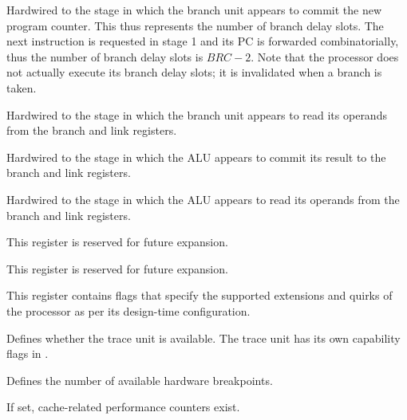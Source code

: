 \reset{****}
Hardwired to the stage in which the branch unit appears to commit the new
program counter. This thus represents the number of branch delay slots. The next
instruction is requested in stage 1 and its PC is forwarded combinatorially,
thus the number of branch delay slots is $BRC - 2$. Note that the \rvex{}
processor does not actually execute its branch delay slots; it is invalidated
when a branch is taken.

\reset{****}
Hardwired to the stage in which the branch unit appears to read its operands 
from the branch and link registers.

\reset{****}
Hardwired to the stage in which the ALU appears to commit its result to the
branch and link registers.

\reset{****}
Hardwired to the stage in which the ALU appears to read its operands from the
branch and link registers.


This register is reserved for future expansion.


This register is reserved for future expansion.


This register contains flags that specify the supported extensions and quirks
of the processor as per its design-time configuration.

\reset{***}
Defines whether the trace unit is available. The trace unit has its own
capability flags in .

\reset{***}
Defines the number of available hardware breakpoints.

\reset{*}
If set, cache-related performance counters exist.

